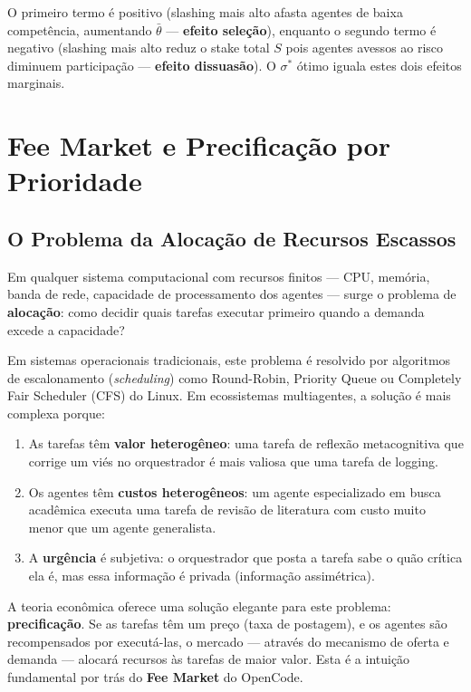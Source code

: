 O primeiro termo é positivo (slashing mais alto afasta agentes de baixa competência, aumentando $\bar{\theta}$ --- \textbf{efeito seleção}), enquanto o segundo termo é negativo (slashing mais alto reduz o stake total $S$ pois agentes avessos ao risco diminuem participação --- \textbf{efeito dissuasão}). O $\sigma^*$ ótimo iguala estes dois efeitos marginais.

\section{Fee Market e Precificação por Prioridade}

\subsection{O Problema da Alocação de Recursos Escassos}

Em qualquer sistema computacional com recursos finitos --- CPU, memória, banda de rede, capacidade de processamento dos agentes --- surge o problema de \textbf{alocação}: como decidir quais tarefas executar primeiro quando a demanda excede a capacidade?

Em sistemas operacionais tradicionais, este problema é resolvido por algoritmos de escalonamento (\textit{scheduling}) como Round-Robin, Priority Queue ou Completely Fair Scheduler (CFS) do Linux. Em ecossistemas multiagentes, a solução é mais complexa porque:

\begin{enumerate}
    \item As tarefas têm \textbf{valor heterogêneo}: uma tarefa de reflexão metacognitiva que corrige um viés no orquestrador é mais valiosa que uma tarefa de logging.
    
    \item Os agentes têm \textbf{custos heterogêneos}: um agente especializado em busca acadêmica executa uma tarefa de revisão de literatura com custo muito menor que um agente generalista.
    
    \item A \textbf{urgência} é subjetiva: o orquestrador que posta a tarefa sabe o quão crítica ela é, mas essa informação é privada (informação assimétrica).
\end{enumerate}

A teoria econômica oferece uma solução elegante para este problema: \textbf{precificação}. Se as tarefas têm um preço (taxa de postagem), e os agentes são recompensados por executá-las, o mercado --- através do mecanismo de oferta e demanda --- alocará recursos às tarefas de maior valor. Esta é a intuição fundamental por trás do \textbf{Fee Market} do OpenCode.

